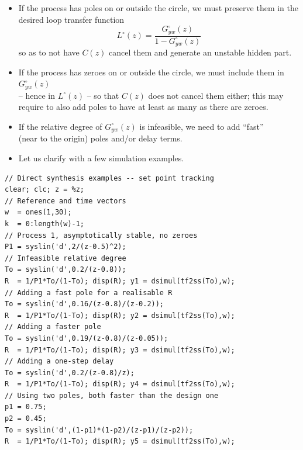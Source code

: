 \begin{frame}
\myPause
 \begin{itemize}[<+-| alert@+>]
 \item If the process has poles on or outside the circle, we must preserve them in the desired loop transfer
       function
       \begin{displaymath}
        L^{\circ}(z) = \frac{G_{yw}^{\circ}(z)}{1-G_{yw}^{\circ}(z)}
       \end{displaymath}
       so as to not have $C(z)$ cancel them and generate an unstable hidden part.
 \item If the process has zeroes on or outside the circle, we must include them in $G_{yw}^{\circ}(z)$\\
       -- hence in $L^{\circ}(z)$ -- so that $C(z)$ does not cancel them either; this may\\
       require to also add poles to have at least as many as there are zeroes.
 \item If the relative degree of $G_{yw}^{\circ}(z)$ is infeasible, we need to add ``fast''\\
       (near to the origin) poles and/or delay terms.
 \item\vfill Let us clarify with a few simulation examples. 
 \end{itemize}
\end{frame}


\begin{frame}[fragile]
{\tiny
\def\baselinestretch{0.3}
\begin{verbatim}
// Direct synthesis examples -- set point tracking
clear; clc; z = %z;
// Reference and time vectors
w  = ones(1,30); 
k  = 0:length(w)-1;
// Process 1, asymptotically stable, no zeroes
P1 = syslin('d',2/(z-0.5)^2);
// Infeasible relative degree
To = syslin('d',0.2/(z-0.8));
R  = 1/P1*To/(1-To); disp(R); y1 = dsimul(tf2ss(To),w);
// Adding a fast pole for a realisable R
To = syslin('d',0.16/(z-0.8)/(z-0.2));
R  = 1/P1*To/(1-To); disp(R); y2 = dsimul(tf2ss(To),w);
// Adding a faster pole
To = syslin('d',0.19/(z-0.8)/(z-0.05));
R  = 1/P1*To/(1-To); disp(R); y3 = dsimul(tf2ss(To),w);
// Adding a one-step delay
To = syslin('d',0.2/(z-0.8)/z);
R  = 1/P1*To/(1-To); disp(R); y4 = dsimul(tf2ss(To),w);
// Using two poles, both faster than the design one
p1 = 0.75;
p2 = 0.45;
To = syslin('d',(1-p1)*(1-p2)/(z-p1)/(z-p2));
R  = 1/P1*To/(1-To); disp(R); y5 = dsimul(tf2ss(To),w);
\end{verbatim}
}
\end{frame}

